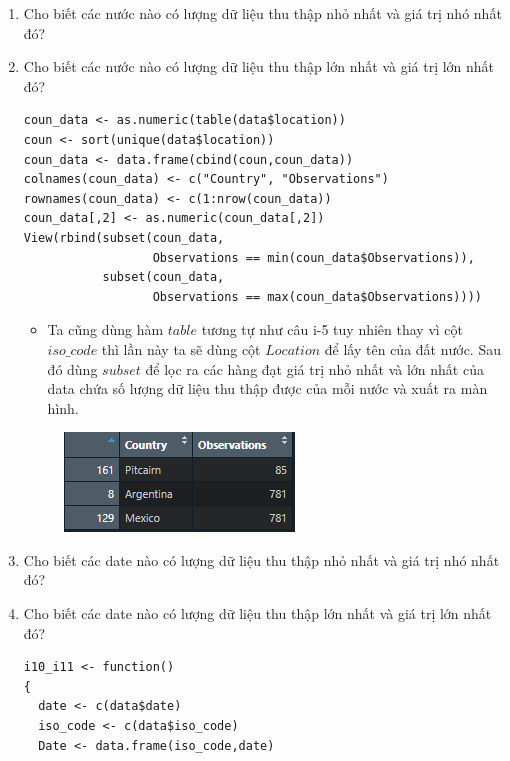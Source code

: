 \documentclass[a4paper]{article}
\theoremstyle{definition}
\begin{document}
\begin{enumerate}[i)]
\begin{enumerate}[1)]
		\item Cho biết các nước nào có lượng dữ liệu thu thập nhỏ nhất và giá trị nhó nhất đó?
		
		\item Cho biết các nước nào có lượng dữ liệu thu thập lớn nhất và giá trị lớn nhất đó?
		\begin{lstlisting}[frame=single]  
coun_data <- as.numeric(table(data$location))
coun <- sort(unique(data$location))
coun_data <- data.frame(cbind(coun,coun_data))
colnames(coun_data) <- c("Country", "Observations")
rownames(coun_data) <- c(1:nrow(coun_data))
coun_data[,2] <- as.numeric(coun_data[,2])
View(rbind(subset(coun_data, 
                  Observations == min(coun_data$Observations)),
           subset(coun_data, 
                  Observations == max(coun_data$Observations))))
	\end{lstlisting}
\begin{itemize}
    \item Ta cũng dùng hàm $table$ tương tự như câu i-5 tuy nhiên thay vì cột $iso\_code$ thì lần này ta sẽ dùng cột $Location$ để lấy tên của đất nước. Sau đó dùng $subset$ để lọc ra các hàng đạt giá trị nhỏ nhất và lớn nhất của data chứa số lượng dữ liệu thu thập được của mỗi nước và xuất ra màn hình.
\end{itemize}
	
	\begin{figure}[h!]
		\begin{center}
		    \includegraphics[]{Images/I/I8+9.png}
		\end{center}
	\end{figure}
		
		\item Cho biết các date nào có lượng dữ liệu thu thập nhỏ nhất và giá trị nhó nhất đó?
		\item Cho biết các date nào có lượng dữ liệu thu thập lớn nhất và giá trị lớn nhất đó?
		
		\begin{lstlisting}[frame=single]  
i10_i11 <- function()
{
  date <- c(data$date)
  iso_code <- c(data$iso_code)
  Date <- data.frame(iso_code,date)
  

\end{lstlisting}
\end{enumerate}
\end{enumerate}
\end{document}
